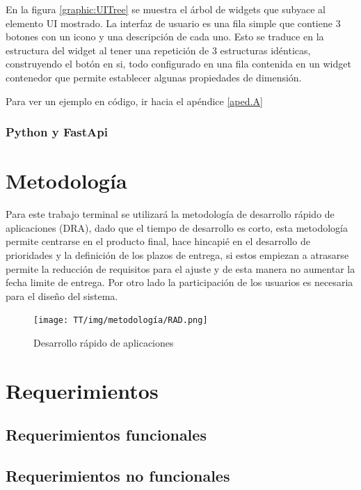 En la figura \ref{graphic:UITree} se muestra el árbol de widgets que subyace al elemento UI mostrado. La interfaz de usuario es una fila simple que contiene 3 botones con un icono y una descripción de cada uno. Esto se traduce en la estructura del widget al tener una repetición de 3 estructuras idénticas, construyendo el botón en si, todo configurado en una fila contenida en un widget contenedor que permite establecer algunas propiedades de dimensión.

Para ver un ejemplo en código, ir hacia el apéndice \ref{aped.A}

\subsubsection{Python y FastApi}

\section{Metodología}
Para este trabajo terminal se utilizará la metodología de desarrollo rápido de aplicaciones (DRA), dado que el tiempo de desarrollo es corto, esta metodología permite centrarse en el producto final, hace hincapié en el desarrollo de prioridades y la definición de los plazos de entrega, si estos empiezan a atrasarse permite la reducción de requisitos para el ajuste y de esta manera no aumentar la fecha limite de entrega. Por otro lado la participación de los usuarios es necesaria para el diseño del sistema.\cite{dra}

\begin{figure}[!ht]
    \centering
    \texttt{[image: TT/img/metodología/RAD.png]}
    \caption{Desarrollo rápido de aplicaciones}
    \label{graphic:RAD}
\end{figure}
\section{Requerimientos}

\subsection{Requerimientos funcionales}

\subsection{Requerimientos no funcionales}

